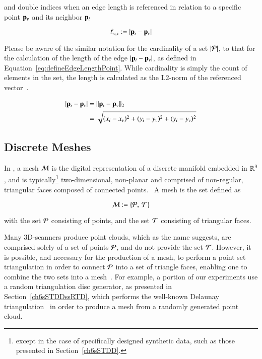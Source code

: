 and double indices when an edge length is referenced in relation to a specific point $\mathbf{p}_v$ and its neighbor $\mathbf{p}_i$

\begin{equation}
	\ell_{v,\kern.75pt i} := |\mathbf{p}_i - \mathbf{p}_v|
	\label{eq:defineEdgeLengthPoint}
\end{equation}%
%

Please be aware of the similar notation for the cardinality of a set $|\mathcal{P}|$, to that for the calculation of the length of the edge $|\mathbf{p}_i - \mathbf{p}_v|$, as defined in Equation~\ref{eq:defineEdgeLengthPoint}. While cardinality is simply the count of elements in the set, the length is calculated as the L2-norm of the referenced vector~\cite[p.~26]{Mara12}.

\begin{equation}
\begin{aligned}
	|\mathbf{p}_i - \mathbf{p}_v| & = \lVert\mathbf{p}_i - \mathbf{p}_v\rVert_2 \\
					& = \sqrt{(x_i-x_v)^2 + (y_i-y_v)^2 + (y_i-y_v)^2}
	\label{eq:defineEdgeLengthCalc}
\end{aligned}
\end{equation}

%
%
%
%
\subsection{Discrete Meshes}
\label{ch2sTDDssDM}
In \tdd{}, a mesh $\mathcal{M}$ is the digital representation of a discrete manifold embedded in $\mathbb{R}^{3}$, and is typically\footnote{except in the case of specifically designed synthetic data, such as those presented in Section~\ref{ch6sSTDD}.} two-dimensional, non-planar and comprised of non-regular, triangular faces composed of connected points.~\cite[p.~25]{Mara12} A mesh is the set defined as

\begin{equation}
	\mathcal{M} := \left \{\mathcal{P},\:\mathcal{T}\right \}
	\label{eq:defineMesh}
\end{equation}%
%

with the set $\mathcal{P}$ consisting of points, and the set $\mathcal{T}$ consisting of triangular faces.

Many 3D-scanners produce point clouds, which as the name suggests, are comprised solely of a set of points $\mathcal{P}$, and do not provide the set $\mathcal{T}$. However, it is possible, and necessary for the production of a mesh, to perform a point set triangulation in order to connect $\mathcal{P}$ into a set of triangle faces, enabling one to combine the two sets into a mesh~\cite[p.~26]{Mara12}. For example, a portion of our experiments use a random triangulation disc generator, as presented in Section~\ref{ch6sSTDDssRTD}, which performs the well-known Delaunay triangulation~\cite{Delaunay34} in order to produce a mesh from a randomly generated point cloud.


